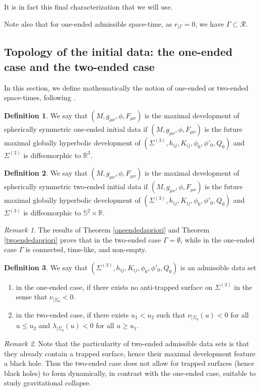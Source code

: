 \documentclass[10pt,a4paper]{article}
\theoremstyle{plain}
\theoremstyle{remark}
\newtheorem{rmk}{Remark}[section]
\newcommand{\R}{\mathcal{R}}
\theoremstyle{definition}
\newtheorem{defn}{Definition}[section]
\newcommand{\RR}{\mathbb{R}}
\theoremstyle{plain}
\theoremstyle{remark}
\theoremstyle{definition}
\numberwithin{equation}{section}
\begin{document}
It is in fact this final characterization that we will use. 

Note also that for one-ended admissible space-time, as $r_{|\Gamma}=0$, we have $\Gamma \subset \R$.



\subsection{Topology of the initial data: the one-ended case and the two-ended case} \label{topology}

In this section, we define mathematically the notion of one-ended or two-ended space-times, following \cite{Kommemi}.

\begin{defn} \label{oneendedef}
	We say that $(M,g_{\mu \nu}, \phi,F_{\mu \nu})$ is the maximal development of spherically symmetric one-ended \color{black}      initial data if $(M,g_{\mu \nu}, \phi,F_{\mu \nu})$ is the future maximal globally hyperbolic development of $(\Sigma^{(3)},h_{i j}, K_{i j}, \phi_0, \phi'_0, Q_0)$ and $\Sigma^{(3)}$ is diffeomorphic to $\RR^3$.
\end{defn}


\begin{defn} \label{twoendedef}
	We say that $(M,g_{\mu \nu}, \phi,F_{\mu \nu})$ is the maximal development of spherically symmetric two-ended initial data if $(M,g_{\mu \nu}, \phi,F_{\mu \nu})$ is the future maximal globally hyperbolic development of $(\Sigma^{(3)},h_{i j}, K_{i j}, \phi_0, \phi'_0, Q_0)$ and $\Sigma^{(3)}$ is diffeomorphic to $ \mathbb{S}^2 \times \RR$.
\end{defn}
\begin{rmk}
	The results of Theorem \ref{oneendedapriori} and Theorem \ref{twoendedapriori} prove that in the two-ended case $\Gamma = \emptyset$, while in the one-ended case $\Gamma$ is connected, time-like, and non-empty.
\end{rmk}
\begin{defn} \label{admissibilitydef}
	We say that  $(\Sigma^{(3)},h_{i j}, K_{i j}, \phi_0, \phi'_0, Q_0)$ is an admissible data set  \begin{enumerate}
		\item in the one-ended case, if there exists no anti-trapped surface on $\Sigma^{(3)}$ in the sense that $\nu_{|\Sigma_0} <0$.
		
		\item in the two-ended case, if there exists $u_1 < u_2$ such that $\nu_{|\Sigma_0}(u) <0$ for all $u \leq u_2$ 
		and $\lambda_{|\Sigma_0}(u) <0$ for all $u \geq u_1$.	
	\end{enumerate}
\end{defn}
\begin{rmk}
	Note that the particularity of two-ended admissible data sets is that they already contain a trapped surface, hence their maximal development feature a black hole. Thus the two-ended case does not allow for trapped surfaces (hence black holes) to form dynamically, in contrast with the one-ended case, suitable to study gravitational collapse.
\end{rmk}
\end{document}
